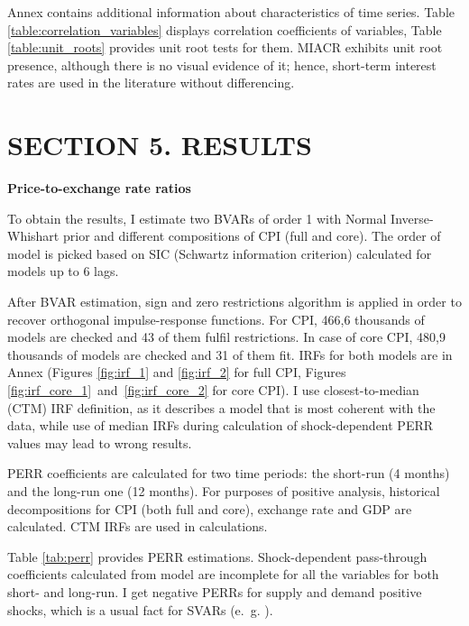 \documentclass[12pt, a4paper]{extarticle}
\begin{document}
Annex contains additional information about characteristics of time series. Table \ref{table:correlation_variables} displays correlation coefficients of variables, Table \ref{table:unit_roots} provides unit root tests for them. \mbox{MIACR} exhibits unit root presence, although there is no visual evidence of it; hence, short-term interest rates are used in the literature without differencing.

\clearpage
\section*{SECTION 5. RESULTS}
\setcounter{section}{4}
\setcounter{subsection}{0}

\begin{center}
	\textbf{Price-to-exchange rate ratios}
\end{center}

To obtain the results, I estimate two BVARs of order 1 with Normal Inverse-Whishart prior and different compositions of CPI (full and core). The order of model is picked based on SIC (Schwartz information criterion) calculated for models up to 6 lags.

After BVAR estimation, sign and zero restrictions algorithm is applied in order to recover orthogonal impulse-response functions. For CPI, 466,6 thousands of models are checked and 43 of them fulfil restrictions. In case of core CPI, 480,9 thousands of models are checked and 31 of them fit. IRFs for both models are in Annex (Figures \ref{fig:irf_1} and \ref{fig:irf_2} for full CPI, Figures \ref{fig:irf_core_1}~and~\ref{fig:irf_core_2} for core CPI). I use closest-to-median (CTM) IRF definition, as it describes a model that is most coherent with the data, while use of median IRFs during calculation of shock-dependent PERR values may lead to wrong results.

PERR coefficients are calculated for two time periods: the short-run (4 months) and the long-run one (12 months). For purposes of positive analysis, historical decompositions for CPI (both full and core), exchange rate and GDP are calculated. CTM IRFs are used in calculations.

Table \ref{tab:perr} provides PERR estimations. Shock-dependent pass-through coefficients calculated from model are incomplete for all the variables for both short- and long-run. I get negative PERRs for supply and demand positive shocks, which is a usual fact for SVARs (e.~g. \cite[p.~55]{Ortega2020}).
\end{document}
